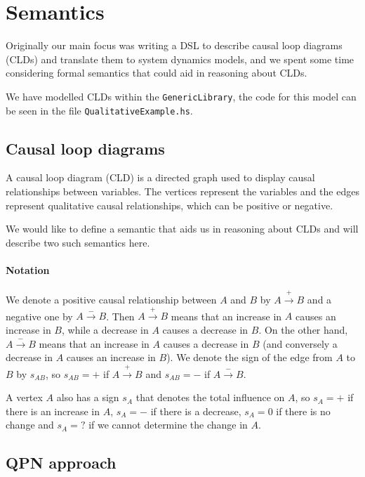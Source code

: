 \section{Semantics}\label{semantics}
Originally our main focus was writing a DSL to describe causal loop diagrams (CLDs) and
translate them to system dynamics models, and we spent some time considering
formal semantics that could aid in reasoning about CLDs.

We have modelled CLDs within the \verb|GenericLibrary|, the code for this model
can be seen in the file \verb|QualitativeExample.hs|. \\

\subsection{Causal loop diagrams}

A causal loop diagram (CLD) is a directed graph used to display causal
relationships between variables.
%
The vertices represent the variables and the edges represent qualitative
causal relationships, which can be positive or negative.

We would like to define a semantic that aids us in reasoning about CLDs and will
describe two such semantics here.

\paragraph{Notation}
We denote a positive causal relationship between $A$ and $B$ by
$A\xrightarrow{+} B$ and a negative one by $A \xrightarrow{-} B$.
%
Then $A \xrightarrow{+} B$ means that an increase in $A$ causes an
increase in $B$, while a decrease in $A$ causes a decrease in $B$.
%
On the other hand, $A\xrightarrow{-} B$ means that an increase in $A$
causes a decrease in $B$ (and conversely a decrease in $A$ causes an
increase in $B$).
%
We denote the sign of the edge from $A$ to $B$ by $s_{AB}$, so
$s_{AB}= +$ if $A\xrightarrow{+} B$ and $s_{AB}=-$ if
$A\xrightarrow{-} B$.

A vertex $A$ also has a sign $s_A$ that denotes the total influence on $A$, so
$s_A=+$ if there is an increase in $A$, $s_A=-$ if there is a decrease, $s_A=0$
if there is no change and $s_A=?$ if we cannot determine the change in $A$.

\subsection{QPN approach}

